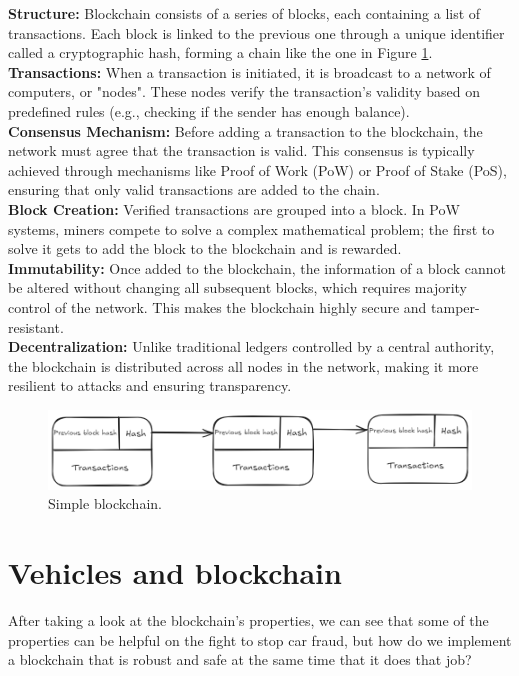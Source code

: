 \documentclass[twocolumn]{article} %
\begin{document}
\textbf{Structure:} Blockchain consists of a series of blocks, each containing a list of transactions. Each block is linked to the previous one through a unique identifier called a cryptographic hash, forming a chain like the one in Figure \ref{fig:simple_blockchain}.\\

\textbf{Transactions:} When a transaction is initiated, it is broadcast to a network of computers, or "nodes". These nodes verify the transaction's validity based on predefined rules (e.g., checking if the sender has enough balance).\\

\textbf{Consensus Mechanism:} Before adding a transaction to the blockchain, the network must agree that the transaction is valid. This consensus is typically achieved through mechanisms like Proof of Work (PoW) or Proof of Stake (PoS), ensuring that only valid transactions are added to the chain.\\

\textbf{Block Creation:} Verified transactions are grouped into a block. In PoW systems, miners compete to solve a complex mathematical problem; the first to solve it gets to add the block to the blockchain and is rewarded.\\

\textbf{Immutability:} Once added to the blockchain, the information of a block cannot be altered without changing all subsequent blocks, which requires majority control of the network. This makes the blockchain highly secure and tamper-resistant.\\

\textbf{Decentralization:} Unlike traditional ledgers controlled by a central authority, the blockchain is distributed across all nodes in the network, making it more resilient to attacks and ensuring transparency.\\

\begin{figure}[h]
    \centering
    \includegraphics[width=1\textwidth]{Images/Simple_blockchain.png} 
    \caption{Simple blockchain.}
    \label{fig:simple_blockchain}
\end{figure}
\newpage
\section{Vehicles and blockchain}
After taking a look at the blockchain's properties, we can see that some of the properties can be helpful on the fight to stop car fraud, but how do we implement a blockchain that is robust and safe at the same time that it does that job?\\
\end{document}
